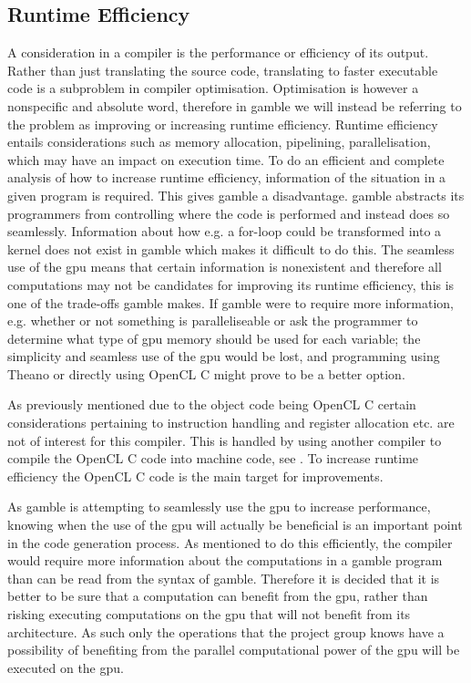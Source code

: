 \subsection*{Runtime Efficiency}\label{subsec:runtime}
A consideration in a compiler is the performance or efficiency of its output. 
Rather than just translating the source code, translating to faster executable code is a subproblem in compiler optimisation.
Optimisation is however a nonspecific and absolute word, therefore in \gls{gamble} we will instead be referring to the problem as improving or increasing runtime efficiency.
Runtime efficiency entails considerations such as memory allocation, pipelining, parallelisation, which may have an impact on execution time.
To do an efficient and complete analysis of how to increase runtime efficiency, information of the situation in a given program is required.
This gives \gls{gamble} a disadvantage. 
\gls{gamble} abstracts its programmers from controlling where the code is performed and instead does so seamlessly.
Information about how e.g. a for-loop could be transformed into a kernel does not exist in \gls{gamble} which makes it difficult to do this.
The seamless use of the \acrshort{gpu} means that certain information is nonexistent and therefore all computations may not be candidates for improving its runtime efficiency, this is one of the trade-offs \gls{gamble} makes.
If \gls{gamble} were to require more information, e.g. whether or not something is paralleliseable or ask the programmer to determine what type of \acrshort{gpu} memory should be used for each variable; the simplicity and seamless use of the \acrshort{gpu} would be lost, and programming using Theano or directly using OpenCL C might prove to be a better option.

As previously mentioned due to the object code being OpenCL C certain considerations pertaining to instruction handling and register allocation etc. are not of interest for this compiler.
This is handled by using another compiler to compile the OpenCL C code into machine code, see . 
To increase runtime efficiency the OpenCL C code is the main target for improvements.

As \gls{gamble} is attempting to seamlessly use the \acrshort{gpu} to increase performance, knowing when the use of the \acrshort{gpu} will actually be beneficial is an important point in the code generation process. 
As mentioned to do this efficiently, the compiler would require more information about the computations in a \gls{gamble} program than can be read from the syntax of \gls{gamble}.
Therefore it is decided that it is better to be sure that a computation can benefit from the \acrshort{gpu}, rather than risking executing computations on the \acrshort{gpu} that will not benefit from its architecture.
As such only the operations that the project group knows have a possibility of benefiting from the parallel computational power of the \acrshort{gpu} will be executed on the \acrshort{gpu}.

